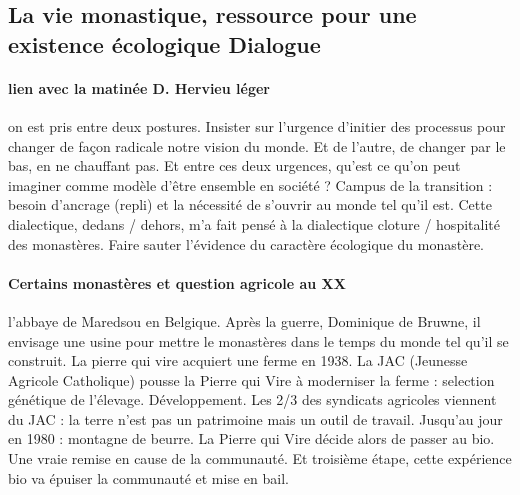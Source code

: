 \subsection{La vie monastique, ressource pour une existence écologique Dialogue}

 

\paragraph{lien avec la matinée D. Hervieu léger} on est pris entre deux postures. Insister sur l'urgence d'initier des processus pour changer de façon radicale notre vision du monde. Et de l'autre, de changer par le bas, en ne chauffant pas.
Et entre ces deux urgences, qu'est ce qu'on peut imaginer comme modèle d'être ensemble en société ? 
Campus de la transition : besoin d'ancrage (repli) et la nécessité de s'ouvrir au monde tel qu'il est. Cette dialectique, dedans / dehors, m'a fait pensé à la dialectique cloture / hospitalité des monastères.
Faire sauter l'évidence du caractère écologique du monastère.


\paragraph{Certains monastères et question agricole au XX} l'abbaye de Maredsou en Belgique. 
Après la guerre, Dominique de Bruwne, il envisage une usine pour mettre le monastères dans le temps du monde tel qu'il se construit. La pierre qui vire acquiert une ferme en 1938. La JAC (Jeunesse Agricole Catholique) pousse la Pierre qui Vire à moderniser la ferme : selection génétique de l'élevage. Développement. Les 2/3 des syndicats agricoles viennent du JAC : la terre n'est pas un patrimoine mais un outil de travail. Jusqu'au jour en 1980 : montagne de beurre. La Pierre qui Vire décide alors de passer au bio. Une vraie remise en cause de la communauté. Et troisième étape, cette expérience bio va épuiser la communauté et mise en bail.



